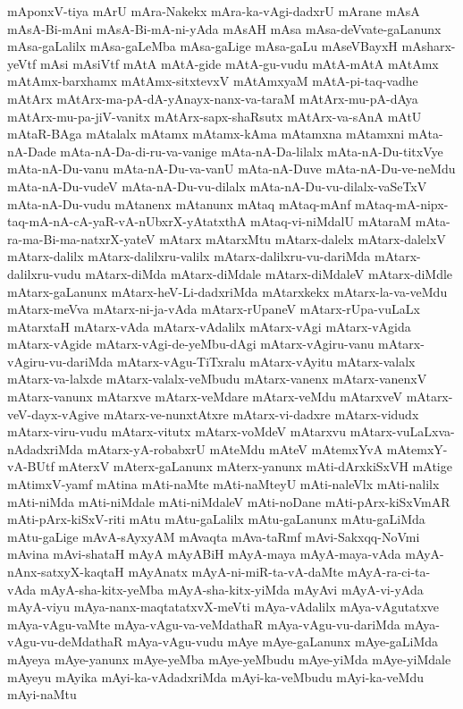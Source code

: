 {mAponxV-tiya
mArU
mAra-Nakekx
mAra-ka-vAgi-dadxrU
mArane
mAsA
mAsA-Bi-mAni
mAsA-Bi-mA-ni-yAda
mAsAH
mAsa
mAsa-deVvate-gaLanunx
mAsa-gaLalilx
mAsa-gaLeMba
mAsa-gaLige
mAsa-gaLu
mAseVBayxH
mAsharx-yeVtf
mAsi
mAsiVtf
mAtA
mAtA-gide
mAtA-gu-vudu
mAtA-mAtA
mAtAmx
mAtAmx-barxhamx
mAtAmx-sitxtevxV
mAtAmxyaM
mAtA-pi-taq-vadhe
mAtArx
mAtArx-ma-pA-dA-yAnayx-nanx-va-taraM
mAtArx-mu-pA-dAya
mAtArx-mu-pa-jiV-vanitx
mAtArx-sapx-shaRsutx
mAtArx-va-sAnA
mAtU
mAtaR-BAga
mAtalalx
mAtamx
mAtamx-kAma
mAtamxna
mAtamxni
mAta-nA-Dade
mAta-nA-Da-di-ru-va-vanige
mAta-nA-Da-lilalx
mAta-nA-Du-titxVye
mAta-nA-Du-vanu
mAta-nA-Du-va-vanU
mAta-nA-Duve
mAta-nA-Du-ve-neMdu
mAta-nA-Du-vudeV
mAta-nA-Du-vu-dilalx
mAta-nA-Du-vu-dilalx-vaSeTxV
mAta-nA-Du-vudu
mAtanenx
mAtanunx
mAtaq
mAtaq-mAnf
mAtaq-mA-nipx-taq-mA-nA-cA-yaR-vA-nUbxrX-yAtatxthA
mAtaq-vi-niMdalU
mAtaraM
mAta-ra-ma-Bi-ma-natxrX-yateV
mAtarx
mAtarxMtu
mAtarx-dalelx
mAtarx-dalelxV
mAtarx-dalilx
mAtarx-dalilxru-valilx
mAtarx-dalilxru-vu-dariMda
mAtarx-dalilxru-vudu
mAtarx-diMda
mAtarx-diMdale
mAtarx-diMdaleV
mAtarx-diMdle
mAtarx-gaLanunx
mAtarx-heV-Li-dadxriMda
mAtarxkekx
mAtarx-la-va-veMdu
mAtarx-meVva
mAtarx-ni-ja-vAda
mAtarx-rUpaneV
mAtarx-rUpa-vuLaLx
mAtarxtaH
mAtarx-vAda
mAtarx-vAdalilx
mAtarx-vAgi
mAtarx-vAgida
mAtarx-vAgide
mAtarx-vAgi-de-yeMbu-dAgi
mAtarx-vAgiru-vanu
mAtarx-vAgiru-vu-dariMda
mAtarx-vAgu-TiTxralu
mAtarx-vAyitu
mAtarx-valalx
mAtarx-va-lalxde
mAtarx-valalx-veMbudu
mAtarx-vanenx
mAtarx-vanenxV
mAtarx-vanunx
mAtarxve
mAtarx-veMdare
mAtarx-veMdu
mAtarxveV
mAtarx-veV-dayx-vAgive
mAtarx-ve-nunxtAtxre
mAtarx-vi-dadxre
mAtarx-vidudx
mAtarx-viru-vudu
mAtarx-vitutx
mAtarx-voMdeV
mAtarxvu
mAtarx-vuLaLxva-nAdadxriMda
mAtarx-yA-robabxrU
mAteMdu
mAteV
mAtemxYvA
mAtemxY-vA-BUtf
mAterxV
mAterx-gaLanunx
mAterx-yanunx
mAti-dArxkiSxVH
mAtige
mAtimxV-yamf
mAtina
mAti-naMte
mAti-naMteyU
mAti-naleVlx
mAti-nalilx
mAti-niMda
mAti-niMdale
mAti-niMdaleV
mAti-noDane
mAti-pArx-kiSxVmAR
mAti-pArx-kiSxV-riti
mAtu
mAtu-gaLalilx
mAtu-gaLanunx
mAtu-gaLiMda
mAtu-gaLige
mAvA-sAyxyAM
mAvaqta
mAva-taRmf
mAvi-Sakxqq-NoVmi
mAvina
mAvi-shataH
mAyA
mAyABiH
mAyA-maya
mAyA-maya-vAda
mAyA-nAnx-satxyX-kaqtaH
mAyAnatx
mAyA-ni-miR-ta-vA-daMte
mAyA-ra-ci-ta-vAda
mAyA-sha-kitx-yeMba
mAyA-sha-kitx-yiMda
mAyAvi
mAyA-vi-yAda
mAyA-viyu
mAya-nanx-maqtatatxvX-meVti
mAya-vAdalilx
mAya-vAgutatxve
mAya-vAgu-vaMte
mAya-vAgu-va-veMdathaR
mAya-vAgu-vu-dariMda
mAya-vAgu-vu-deMdathaR
mAya-vAgu-vudu
mAye
mAye-gaLanunx
mAye-gaLiMda
mAyeya
mAye-yanunx
mAye-yeMba
mAye-yeMbudu
mAye-yiMda
mAye-yiMdale
mAyeyu
mAyika
mAyi-ka-vAdadxriMda
mAyi-ka-veMbudu
mAyi-ka-veMdu
mAyi-naMtu
}
